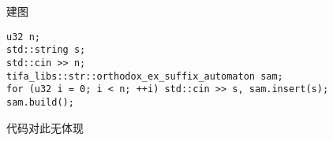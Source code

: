 建图

\begin{verbatim}
u32 n;
std::string s;
std::cin >> n;
tifa_libs::str::orthodox_ex_suffix_automaton sam;
for (u32 i = 0; i < n; ++i) std::cin >> s, sam.insert(s);
sam.build();
\end{verbatim}


代码对此无体现\\
\\